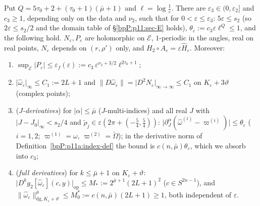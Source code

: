 \begin{proposition}\label{bpP:p11:prepared}
Put $Q=5\tau_0+2+(\tau_0+1)(\bar\mu+1)$ and $\ell=\log\frac1\varepsilon$. There are $\varepsilon_3\in(0,\varepsilon_2]$ and $c_3\ge1$, depending only on the data and $\nu_2$, such that for $0<\varepsilon\le\varepsilon_3$: $5\varepsilon\le s_2$ (so $2\varepsilon\le s_2/2$ and the domain table of \S\ref{bpP:p11:sec-E} holds), $\theta_\varepsilon:=c_3\varepsilon\ell^Q\le1$, and the following hold. $N_\varepsilon,P_\varepsilon$ are holomorphic on $\mathcal E$, $1$-periodic in the angles, real on real points, $N_\varepsilon$ depends on $(r,\rho')$ only, and $H_2\circ A_\varepsilon=\varepsilon\hat H_\varepsilon$. Moreover:
\begin{enumerate}[label=(\alph*)]
\item $\sup_{\mathcal E}\lvert P_\varepsilon\rvert\le\varepsilon_f(\varepsilon):=c_3\,\varepsilon^{\nu_2+3/2}\ell^{2\tau_0+1}$;
\item $\lvert\hat\omega_\varepsilon\rvert_\infty\le C_1:=2L+1$ and $\lVert D\hat\omega_\varepsilon\rVert=\lvert D^2N_\varepsilon\rvert_{\infty\to\infty}\le C_1$ on $K_\varepsilon+3\vartheta$ (complex points);
\item (\emph{$J$-derivatives}) for $\lvert\alpha\rvert\le\bar\mu$ ($J$-multi-indices) and all real $J$ with $\lvert J-J_0\rvert_\infty<s_2/4$ and $\tilde\rho_j\in\varepsilon(2\pi+(-\frac54,\frac54))$: $\lvert\partial_J^\alpha(\hat\omega^{(i)}-\varpi^{(i)})\rvert\le\theta_\varepsilon$ ($i=1,2$; $\varpi^{(1)}=\omega$, $\varpi^{(2)}=\tilde\Omega$); in the derivative norm of Definition~\ref{bpP:p11a:index-def} the bound is $c(n,\bar\mu)\theta_\varepsilon$, which we absorb into $c_3$;
\item (\emph{full derivatives}) for $k\le\bar\mu+1$ on $K_\varepsilon+\vartheta$: $\lvert D^kg_2[\hat\omega_\varepsilon](c,y)\rvert_{\mathrm{op}}\le M_*:=2^{\bar\mu+1}(2L+1)^2$ ($c\in S^{2n-1}$), and $\lVert\hat\omega_\varepsilon\rVert^{\bar\mu}_{\mathrm{dg},K_\varepsilon+\vartheta}\le M_0^*:=c(n,\bar\mu)(2L+1)\ge1$, both independent of $\varepsilon$.
\end{enumerate}
\end{proposition}
